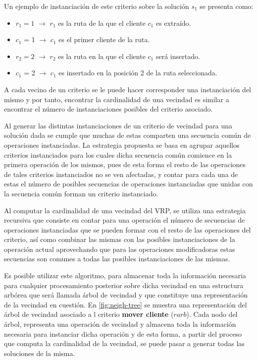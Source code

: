 Un ejemplo de instanciación de este criterio sobre la solución $s_1$ se presenta como:

\begin{itemize}
	\item $r_1 = 1$ $\rightarrow$ $r_1$ es la ruta de la que el cliente $c_1$ es extraído.
	\item $c_1$ = 1 $\rightarrow$ $c_1$ es el primer cliente de la ruta.
	\item $r_2 = 2$ $\rightarrow$ $r_2$ es la ruta en la que el cliente $c_1$ será insertado.
	\item $c_1$ = 2 $\rightarrow$ $c_1$ es insertado en la posición 2 de la ruta seleccionada.
\end{itemize}

A cada vecino de un criterio se le puede hacer corresponder una instanciación del mismo y por tanto, encontrar la cardinalidad de una vecindad es similar a encontrar el número de instanciaciones posibles del criterio asociado.

Al generar las distintas instanciaciones de un criterio de vecindad para
una solución dada se cumple que muchas de estas comparten una secuencia común de operaciones instanciadas. La estrategia propuesta se basa en agrupar aquellos criterios instanciados para los cuales dicha secuencia común comience en la primera operación de los mismos, pues de esta forma el resto de las operaciones de tales criterios instanciados no se ven afectadas, y contar para cada una de estas el número de posibles secuencias de operaciones instanciadas que unidas con la secuencia común forman un criterio instanciado.

Al computar la cardinalidad de una vecindad del VRP, se utiliza una estrategia recursiva que consiste en contar para una operación el número de secuencias de operaciones instanciadas que se pueden formar con el resto de las operaciones del criterio, así como combinar las mismas con las posibles instanciaciones de la operación actual aprovechando que para las operaciones modificadoras estas secuencias son comunes a todas las posibles instanciaciones de las mismas.

Es posible utilizar este algoritmo, para almacenar toda la información necesaria para cualquier procesamiento posterior sobre dicha vecindad en una estructura arbórea que será llamada árbol de vecindad y que constituye una representación de la vecindad en cuestión. En \ref{fig:neigh-tree} se muestra una representación del árbol de vecindad asociado a l criterio \textbf{mover cliente} ($rarb$). Cada nodo del árbol, representa una operación de vecindad y almacena toda la información necesaria para instanciar dicha operación y de esta forma, a partir del proceso que computa la cardinalidad de la vecindad, se puede pasar a generar todas las soluciones de la misma.


